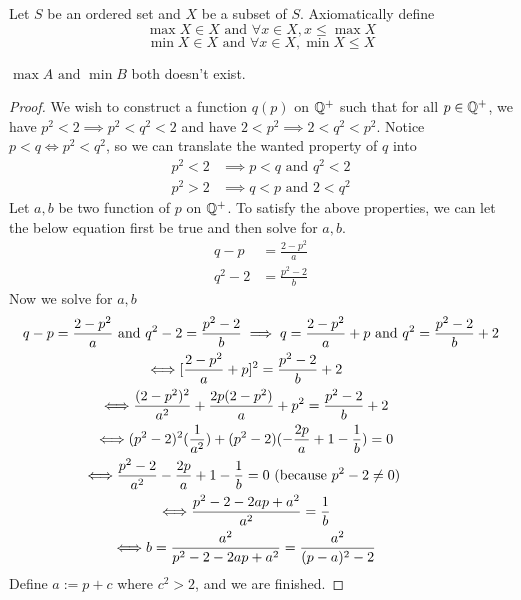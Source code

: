\documentclass{report}
\begin{document}
\begin{axiom}
Let $S$ be an ordered set and $X$ be a subset of $S$. Axiomatically define
\begin{equation}
\max X\in X\text{ and }\forall x\in X, x\leq \max X
\end{equation}
\begin{equation}
\min X\in X \text{ and }\forall x\in X, \min X\leq X
\end{equation}
\end{axiom}
\begin{theorem}
  $\max A\text{ and }\min B$ both doesn't exist.
\end{theorem}
\begin{proof}
We wish to construct a function $q(p)$ on $\mathbb{Q}^+$ such that for all $p \in\mathbb{Q}^+$, we have $p^2<2\implies p^2<q^2<2$ and have $2<p^2\implies 2<q^2<p^2$. Notice $p<q\iff p^2<q^2$, so we can translate the wanted property of $q$ into
\begin{align}
  p^2<2 & \implies p<q \text{ and }q^2<2\\
  p^2>2 & \implies q<p\text{ and }2<q^2
\end{align}
Let $a,b$ be two function of $p$ on $\mathbb{Q}^+$. To satisfy the above properties, we can let the below equation first be true and then solve for $a,b$.
\begin{align}
  q-p&=\frac{2-p^2}{a}\\
  q^2-2 &= \frac{p^2-2}{b}
\end{align}
Now we solve for $a,b$
\begin{gather}
q-p=\frac{2-p^2}{a}\text{ and }q^2-2=\frac{p^2-2}{b}
\implies q= \frac{2-p^2}{a}+p\text{ and }q^2=\frac{p^2-2}{b}+2\\
\liff [\frac{2-p^2}{a}+p]^2=\frac{p^2-2}{b}+2\\
\liff \frac{(2-p^2)^2}{a^2}+\frac{2p(2-p^2)}{a}+p^2=\frac{p^2-2}{b}+2\\
\liff (p^2-2)^2(\frac{1}{a^2})+(p^2-2)(-\frac{2p}{a}+1-\frac{1}{b})=0\\
\liff \frac{p^2-2}{a^2}-\frac{2p}{a}+1-\frac{1}{b}=0\text{ (because $p^2-2\neq 0$) }\\
\liff \frac{p^2-2-2ap+a^2}{a^2}=\frac{1}{b}\\
\liff b=\frac{a^2}{p^2-2-2ap+a^2}=\frac{a^2}{(p-a)^2-2}
\end{gather}
Define $a:=p+c$ where $c^2>2$, and we are finished.
\end{proof}
\end{document}
